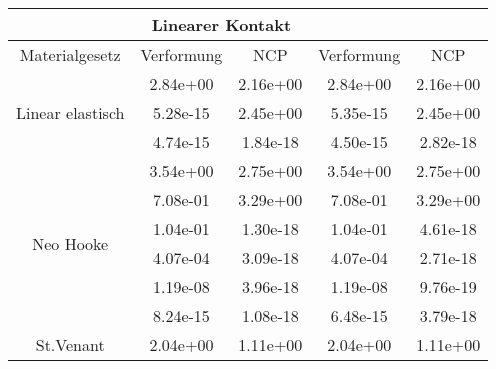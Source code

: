 \begin{table} 
\centering 
\begin{tabular}{c|cc|cc|} 
\cline{2-5} 
 & \multicolumn{2}{|c|}{Linearer Kontakt} &  \\ 
\hline 
\multicolumn{1}{|c|}{Materialgesetz} & \multicolumn{1}{c|}{Verformung} & \multicolumn{1}{c|}{NCP} & \multicolumn{1}{c|}{Verformung} & \multicolumn{1}{c|}{NCP} \\ 
\hline 
\multicolumn{1}{|c|}{\multirow{3}{*}{Linear elastisch}} &\multicolumn{1}{|c|}{  2.84e+00} & \multicolumn{1}{|c|}{  2.16e+00} & \multicolumn{1}{|c|}{  2.84e+00} & \multicolumn{1}{|c|}{  2.16e+00} \\ 
\multicolumn{1}{|c|}{} & \multicolumn{1}{|c|}{  5.28e-15} & \multicolumn{1}{|c|}{  2.45e+00} & \multicolumn{1}{|c|}{  5.35e-15} & \multicolumn{1}{|c|}{  2.45e+00} \\ 
\multicolumn{1}{|c|}{} & \multicolumn{1}{|c|}{  4.74e-15} & \multicolumn{1}{|c|}{  1.84e-18} & \multicolumn{1}{|c|}{  4.50e-15} & \multicolumn{1}{|c|}{  2.82e-18} \\ 
\hline 
\multicolumn{1}{|c|}{\multirow{6}{*}{Neo Hooke}} &\multicolumn{1}{|c|}{  3.54e+00} & \multicolumn{1}{|c|}{  2.75e+00} & \multicolumn{1}{|c|}{  3.54e+00} & \multicolumn{1}{|c|}{  2.75e+00} \\ 
\multicolumn{1}{|c|}{} & \multicolumn{1}{|c|}{  7.08e-01} & \multicolumn{1}{|c|}{  3.29e+00} & \multicolumn{1}{|c|}{  7.08e-01} & \multicolumn{1}{|c|}{  3.29e+00} \\ 
\multicolumn{1}{|c|}{} & \multicolumn{1}{|c|}{  1.04e-01} & \multicolumn{1}{|c|}{  1.30e-18} & \multicolumn{1}{|c|}{  1.04e-01} & \multicolumn{1}{|c|}{  4.61e-18} \\ 
\multicolumn{1}{|c|}{} & \multicolumn{1}{|c|}{  4.07e-04} & \multicolumn{1}{|c|}{  3.09e-18} & \multicolumn{1}{|c|}{  4.07e-04} & \multicolumn{1}{|c|}{  2.71e-18} \\ 
\multicolumn{1}{|c|}{} & \multicolumn{1}{|c|}{  1.19e-08} & \multicolumn{1}{|c|}{  3.96e-18} & \multicolumn{1}{|c|}{  1.19e-08} & \multicolumn{1}{|c|}{  9.76e-19} \\ 
\multicolumn{1}{|c|}{} & \multicolumn{1}{|c|}{  8.24e-15} & \multicolumn{1}{|c|}{  1.08e-18} & \multicolumn{1}{|c|}{  6.48e-15} & \multicolumn{1}{|c|}{  3.79e-18} \\ 
\hline 
\multicolumn{1}{|c|}{\multirow{6}{*}{St.Venant}} &\multicolumn{1}{|c|}{  2.04e+00} & \multicolumn{1}{|c|}{  1.11e+00} & \multicolumn{1}{|c|}{  2.04e+00} & \multicolumn{1}{|c|}{  1.11e+00} \\ 

\end{tabular}
\end{table}
